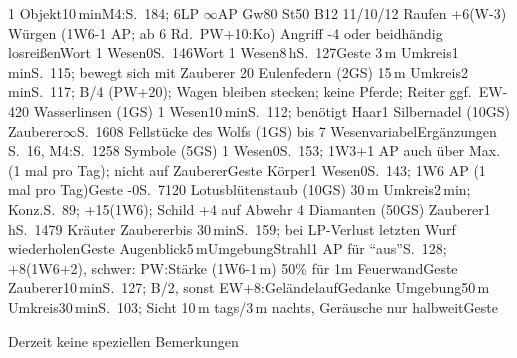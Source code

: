 \documentclass{m5figur-mv}[2016/01/04]
\begin{document}
{%
  {1 Objekt}{10\,min}{M4:S.~184; 6LP $\infty$AP Gw80 St50 B12 11/10/12
  Raufen +6(W-3) Würgen (1W6-1 AP; ab 6 Rd.\ PW+10:Ko)
  Angriff -4 oder beidhändig losreißen}{Wort}
%
  {1 Wesen}{0}{S.~146}{Wort}
%
  {1 Wesen}{8\,h}{S.~127}{Geste}
%
  {3\,m Umkreis}{1\,min}{S.~115; bewegt sich mit Zauberer}%
  {20 Eulenfedern (2GS)}
%
  {15\,m Umkreis}{2\,min}{S.~117; B/4 (PW+20); Wagen bleiben stecken;
  keine Pferde; Reiter ggf.\ EW-4}{20 Wasserlinsen (1GS)}
%
  {1 Wesen}{10\,min}{S.~112; benötigt Haar}{1 Silbernadel (10GS)}
%
  {Zauberer}{$\infty$}{S.~160}{8 Fellstücke des Wolfs (1GS)}
%
  {bis 7 Wesen}{variabel}{Ergänzungen S.~16, M4:S.~125}{8 Symbole (5GS)}
%
  {1 Wesen}{0}{S.~153; 1W3+1 AP auch über Max. (1 mal pro Tag);
  nicht auf Zauberer}{Geste}
%
  {Körper}{1 Wesen}{0}{S.~143; 1W6 AP (1 mal pro Tag)}{Geste}
%
  {-}{0}{S.~71}{20 Lotusblütenstaub (10GS)}
%
  {30\,m Umkreis}{2\,min; Konz.}{S.~89; +15(1W6); Schild +4 auf Abwehr}%
  {4 Diamanten (50GS)}
%
  {Zauberer}{1\,h}{S.~147}{9 Kräuter}
%
  {Zauberer}{bis 30\,min}{S.~159;
  bei LP-Verlust letzten Wurf wiederholen}{Geste}
%
  {Augenblick}{5\,m}{Umgebung}{Strahl}{1 AP für "`aus"'}{S.~128;
  +8(1W6+2), schwer: PW:Stärke (1W6-1\,m) 50\% für 1m Feuerwand}{Geste}
%
  {Zauberer}{10\,min}{S.~127; B/2, sonst EW+8:Geländelauf}{Gedanke}
%
  {Umgebung}{50\,m Umkreis}{30\,min}{S.~103; Sicht 10\,m tags/3\,m nachts,
  Geräusche nur halbweit}{Geste}




Derzeit keine speziellen Bemerkungen
\clearpage

}%
\end{document}
